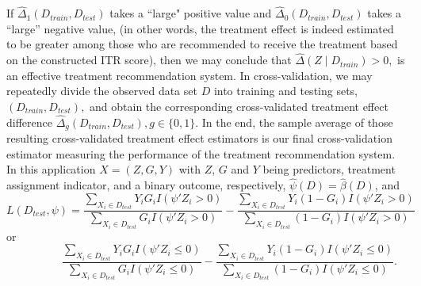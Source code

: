 \documentclass[12pt]{article}
\begin{document}
If $\widehat{\Delta}_1(D_{train}, D_{test})$ takes a ``large" positive value and $\widehat{\Delta}_0(D_{train}, D_{test})$ takes a ``large'' negative value, (in other words, the treatment effect is indeed estimated to be greater among those who are recommended to receive the treatment based on the constructed ITR score), then  we may conclude that $\widehat{\Delta}(Z\mid D_{train})>0, $ is an effective treatment recommendation system. 
In cross-validation, we may repeatedly divide the observed data set $D$ into training and testing sets, $(D_{train}, D_{test}),$ and obtain the corresponding cross-validated treatment effect difference $\widehat{\Delta}_g(D_{train}, D_{test}), g\in \{0, 1\}$.  In the end, the sample average of those resulting cross-validated treatment effect estimators is our final cross-validation estimator measuring the performance of the treatment recommendation system. In this application $X=(Z,G,Y)$ with $Z$, $G$ and $Y$ being predictors, treatment assignment indicator, and a binary outcome, respectively, $\hat{\psi}(D)=\hat{\beta}(D)$, and 
$$L\left(D_{test}, \psi\right)=\frac{\sum_{X_i\in D_{test}}Y_iG_iI(\psi'Z_i>0)}{\sum_{X_i\in D_{test}} G_i I(\psi'Z_i>0)}-\frac{\sum_{X_i\in D_{test}}Y_i(1-G_i)I(\psi'Z_i>0)}{\sum_{X_i\in D_{test}}(1-G_i)I(\psi'Z_i>0)}$$
or
$$
~~~~~~~~~~~~~~~~~~~\frac{\sum_{X_i\in D_{test}}Y_iG_iI(\psi'Z_i\le 0)}{\sum_{X_i\in D_{test}} G_i I(\psi'Z_i\le 0)}-\frac{\sum_{X_i\in D_{test}}Y_i(1-G_i)I(\psi'Z_i\le 0)}{\sum_{X_i\in D_{test}}(1-G_i)I(\psi'Z_i\le 0)}.
$$
\end{document}
